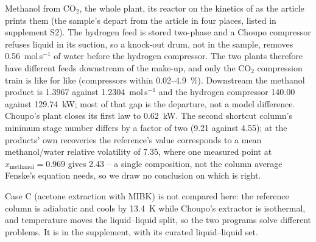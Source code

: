 \documentclass[preprint,12pt]{elsarticle}
\begin{document}
\begin{description}[leftmargin=1.2em, itemsep=2pt]
\item[D] Methanol from CO$_2$, the whole plant, its reactor on the kinetics
  of \citet{vandenbussche1996} as the article prints them (the sample's
  depart from the article in four places, listed in supplement S2).  The hydrogen feed is
  stored two-phase and a Choupo compressor refuses liquid in its suction,
  so a knock-out drum, not in the sample, removes 0.56~mol\,s$^{-1}$ of
  water before the hydrogen compressor.  The two plants therefore have
  different feeds downstream of the make-up, and only the CO$_2$
  compression train is like for like (compressors within 0.02--4.9~\%).
  Downstream the methanol product is 1.3967 against 1.2304~mol\,s$^{-1}$
  and the hydrogen compressor 140.00 against 129.74~kW; most of that gap
  is the departure, not a model difference.  Choupo's plant closes its
  first law to 0.62~kW.  The second shortcut column's minimum stage number
  differs by a factor of two (9.21 against 4.55); at the products' own
  recoveries the reference's value corresponds to a mean methanol/water
  relative volatility of 7.35, where one measured point at
  $x_\text{methanol} = 0.969$ gives 2.43 -- a single composition, not the
  column average Fenske's equation needs, so we draw no conclusion on which
  is right.
\end{description}
Case C (acetone extraction with MIBK) is not compared here: the reference
column is adiabatic and cools by 13.4~K while Choupo's extractor is
isothermal, and temperature moves the liquid--liquid split, so the two
programs solve different problems.  It is in the supplement, with its
curated liquid--liquid set.
\end{document}
